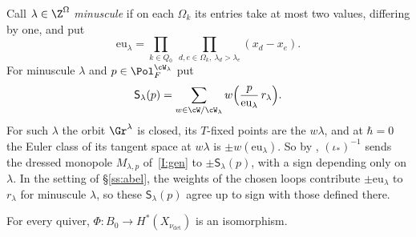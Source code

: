 \documentclass[11pt]{amsart}
\begin{document}
Call $\lambda\in\Z^\Omega$ \emph{minuscule} if on each $\Omega_k$ its entries
take at most two values, differing by one, and put
\[
 \mathrm{eu}_\lambda=\prod_{k\in Q_0}\ \prod_{d,e\in\Omega_k,\ \lambda_d>\lambda_e}(x_d-x_e).
\]
For minuscule $\lambda$ and $p\in\Pol_F^{\cW_\lambda}$ put
\[
 \mathsf S_\lambda(p)=\sum_{w\in\cW/\cW_\lambda}w\Big(\frac{p}{\mathrm{eu}_\lambda}\,r_\lambda\Big).
\]
For such $\lambda$ the orbit $\Gr^\lambda$ is closed, its $T$-fixed points
are the $w\lambda$, and at $\hbar=0$ the Euler class of its tangent space at
$w\lambda$ is $\pm w(\mathrm{eu}_\lambda)$.  So by \cite[Prop.~6.6]{BFN},
$(\iota_*)^{-1}$ sends the dressed monopole $M_{\lambda,p}$ of~\ref{I:gen} to
$\pm\mathsf S_\lambda(p)$, with a sign depending only on $\lambda$.  In the
setting of \S\ref{ss:abel}, the weights of the chosen loops contribute
$\pm\mathrm{eu}_\lambda$ to $r_\lambda$ for minuscule $\lambda$, so these $\mathsf
S_\lambda(p)$ agree up to sign with those defined there.

\begin{proposition}\label{prop:loopremoval}
For every quiver, $\Phi\colon B_0\to H^*(X_{\nu_{\det}})$ is an
isomorphism.
\end{proposition}
\end{document}
